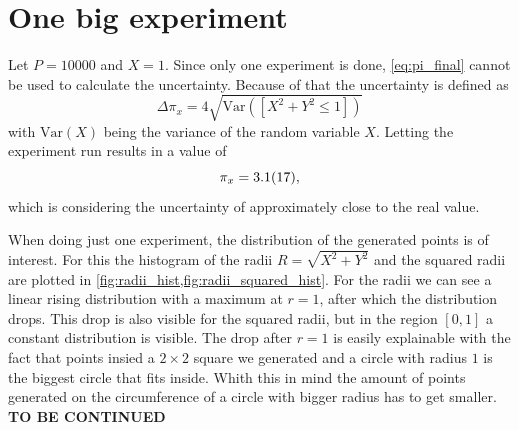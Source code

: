 \section{One big experiment}\label{sec:1}
Let $P = \num{10000}$ and $X = 1$. Since only one experiment is done,
\cref{eq:pi_final} cannot be used to calculate the uncertainty. Because of that
the uncertainty is defined as
\begin{equation*}
	\Delta \pi_x = 4\sqrt{\text{Var}([X^2 + Y^2 \leq 1])}
\end{equation*}
with $\text{Var}(X)$ being the variance of the random variable $X$.
Letting the experiment run results in a value of
\begin{equation}
	\pi_x = \num{3.1 \pm 1.7},
\end{equation}
which is considering the uncertainty of approximately  close to the real value.\par
%
When doing just one experiment, the distribution of the generated points is 
of interest. For this the histogram of the radii $R = \sqrt{X^2 + Y^2}$
and the squared radii are plotted in \cref{fig:radii_hist,fig:radii_squared_hist}.
For the radii we can see a linear rising distribution with a maximum at $r=1$, after which 
the distribution drops. This drop is also visible for the squared radii, but 
in the region $[0,1]$ a constant distribution is visible. The drop after 
$r=1$ is easily explainable with the fact that points insied a $2\times 2$ square
we generated and a circle with radius $1$ is the biggest circle that fits inside.
Whith this in mind the amount of points generated on the circumference of a 
circle with bigger radius has to get smaller.
\textbf{TO BE CONTINUED}


